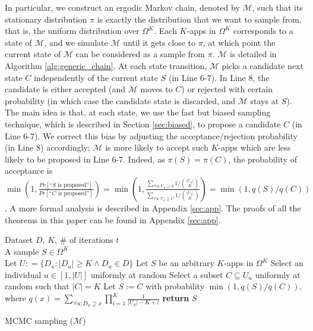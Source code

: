 \documentclass{acm_proc_article-sp}
\theoremstyle{plain}
\theoremstyle{plain}
\theoremstyle{plain}
\theoremstyle{plain}
\theoremstyle{plain}
\theoremstyle{plain}
\newcommand{\mc}[1]{\mathcal{#1}}
\begin{document}
In particular, we construct an ergodic Markov chain, denoted by $\mathcal{M}$,
such that its stationary distribution $\pi$ is exactly the distribution that we want to sample from, that is, the uniform distribution over $\Omega^K$.  Each $K$-apps in $\Omega^K$ corresponds to a state of $\mc{M}$, and we simulate $\mc{M}$ until it gets close to $\pi$, at which point the current state of $\mc{M}$ can be considered as a sample from $\pi$. 
$\mathcal{M}$ is detailed in Algorithm \ref{alg:generic_chain}. At each state transition, $\mc{M}$ picks a candidate next state $C$ independently of the current state $S$ (in Line 6-7). In Line 8, the candidate is either accepted  (and $\mc{M}$ moves to $C$) or rejected with certain probability (in which case the candidate state is discarded, and $\mc{M}$ stays at  $S$). 
The main idea is that, at each state, we use the fast but biased sampling technique, which is described in Section \ref{sec:biased}, to propose a candidate $C$ (in Line 6-7). We correct this bias by adjusting the acceptance/rejection probability (in Line 8) accordingly; $\mathcal{M}$ is more likely to accept such $K$-apps which are less likely to be proposed in Line 6-7. Indeed, as  $\pi(S) = \pi(C)$, the probability of acceptance is
$\min\left(1,  \frac{ Pr[\text{``$S$ is proposed''}]}{Pr[\text{``$C$ is proposed''}]}\right) = \min\left(1, \frac{\sum_{\forall u : U_u \supseteq S}  1 / {|U_u| \choose K}}{ \sum_{\forall u : U_u \supseteq C}  1 / {|U_u| \choose K}}\right) = \min \left(1, q(S)/q(C)\right)$. A more formal analysis is described in Appendix \ref{sec:app}. The proofs of all the theorems in this paper can be found in Appendix \ref{sec:app}.


\begin{algorithm}[h!]
\begin{algorithmic}[1]
\small
{} Dataset $D$, $K$, \# of iterations $t$ \\
 A sample $S \in \Omega^K$\\
\STATE Let $U : = \{D_u : |D_u| \geq K \wedge D_u \in D\}$
\STATE Let $S$ be an arbitrary $K$-apps in $\Omega^K$ 
\STATE Select an individual $u \in [1,|U|]$ uniformly at random 
\STATE Select a subset $C \subseteq U_u$ uniformly at random such that $|C| = K$
\STATE Let $S := C$ with probability $\min\left(1, q(S)/q(C)\right)$, where $q(x) = \sum_{\forall u : D_u \supseteq x} \prod_{i = 1}^{K} \frac{1}{|U_u| - K + i} $
\ENDFOR
\STATE \textbf{return} $S$ 
\end{algorithmic}
\caption{MCMC sampling ($\mc{M}$)} \label{alg:generic_chain}
\end{algorithm}  
\end{document}
